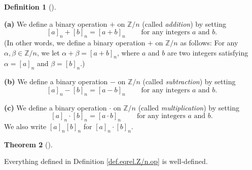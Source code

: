 \documentclass[numbers=enddot,12pt,final,onecolumn,notitlepage]{scrartcl}%
\numberwithin{exer}{subsection}
\theoremstyle{definition}
\newtheorem{theo}{Theorem}[subsection]
\newenvironment{theorem}[1][]
{\begin{theo}[#1]\begin{leftbar}}
{\end{leftbar}\end{theo}}
\newtheorem{defi}[theo]{Definition}
\newenvironment{definition}[1][]
{\begin{defi}[#1]\begin{leftbar}}
{\end{leftbar}\end{defi}}
\begin{document}
\begin{definition}
\label{def.eqrel.Z/n.op}\textbf{(a)} We define a binary operation $+$ on
$\mathbb{Z}/n$ (called \textit{addition}) by setting%
\[
\left[  a\right]  _{n}+\left[  b\right]  _{n}=\left[  a+b\right]
_{n}\ \ \ \ \ \ \ \ \ \ \text{for any integers }a\text{ and }b.
\]
(In other words, we define a binary operation $+$ on $\mathbb{Z}/n$ as
follows: For any $\alpha,\beta\in\mathbb{Z}/n$, we let $\alpha+\beta=\left[
a+b\right]  _{n}$, where $a$ and $b$ are two integers satisfying
$\alpha=\left[  a\right]  _{n}$ and $\beta=\left[  b\right]  _{n}$.)

\textbf{(b)} We define a binary operation $-$ on $\mathbb{Z}/n$ (called
\textit{subtraction}) by setting%
\[
\left[  a\right]  _{n}-\left[  b\right]  _{n}=\left[  a-b\right]
_{n}\ \ \ \ \ \ \ \ \ \ \text{for any integers }a\text{ and }b.
\]


\textbf{(c)} We define a binary operation $\cdot$ on $\mathbb{Z}/n$ (called
\textit{multiplication}) by setting%
\[
\left[  a\right]  _{n}\cdot\left[  b\right]  _{n}=\left[  a\cdot b\right]
_{n}\ \ \ \ \ \ \ \ \ \ \text{for any integers }a\text{ and }b.
\]
We also write $\left[  a\right]  _{n}\left[  b\right]  _{n}$ for $\left[
a\right]  _{n}\cdot\left[  b\right]  _{n}$.
\end{definition}

\begin{theorem}
\label{thm.eqrel.Z/n.op.wd}Everything defined in Definition
\ref{def.eqrel.Z/n.op} is well-defined.
\end{theorem}
\end{document}
